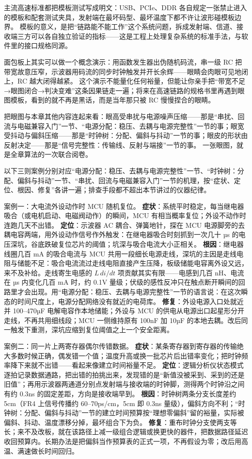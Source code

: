 主流高速标准都把模板测试写成明文：USB、PCIe、DDR 各自规定一张禁止进入的模板和配套测试夹具，发射端在最坏码型、最坏温度下都不许让波形碰模板边界。
模板的意义，是把“链路能不能工作”这个系统问题，拆成发射端、信道、接收端三方可以各自独立验证的指标——这是工程上处理复杂系统的标准手法，与软件里的接口规格同源。

面包板上其实可以做一个概念演示：用函数发生器出伪随机码流，串一级 RC 把带宽故意压窄，示波器用码流的同步时钟触发并开长余辉——眼睛会肉眼可见地闭上，RC 越大闭得越紧。
这个演示不能量化任何裕量，但能让你亲手把“带宽不足→眼图闭合→判决变难”这条因果链走一遍；将来在高速链路的规格书里再遇到眼图模板，看到的就不再是黑话，而是当年那只被 RC 慢慢捏合的眼睛。

把眼图与本章其他内容连起来看：眼高受串扰与电源噪声压缩——那是“串扰、回流与电磁兼容入门”一节、“电源分配：稳压、去耦与电源完整性”一节的事；眼宽受抖动与偏斜压缩——那是“时钟树：分配、偏斜与抖动”一节的事；眼皮的形状由反射决定——那是“信号完整性：传输线、反射与端接”一节的事。
一张眼图，就是全章算法的一次联合阅卷。

以下三则案例分别对应“电源分配：稳压、去耦与电源完整性”一节、“时钟树：分配、偏斜与抖动”一节、“串扰、回流与电磁兼容入门”一节的机理，按“症状、定位、根因、修复”各讲一遍；排查手段都不超出本节讲过的仪器纪律。

案例一：大电流外设动作时 MCU 随机复位。
\textbf{症状}：系统平时稳定，每当继电器吸合（或电机启动、电磁阀动作）的瞬间，MCU 有相当概率复位；外设不动作时连跑几天不出错。
\textbf{定位}：示波器 AC 耦合、弹簧地针，探在 MCU 电源脚旁的去耦电容两端，用外设动作信号作外触发：在继电器吸合时刻抓到一次几十 µs 的电压深坑，谷底跌破复位芯片的阈值；坑深与吸合电流大小正相关。
\textbf{根因}：继电器线圈几百 mA 的吸合电流与 MCU 共用一段细长电源走线，深坑的主因是走线电阻与储能不足：吸合电流流过走线电阻直接产生压降，板级储能电容离外设又远，来不及补给。走线寄生电感的 $L\,di/dt$ 项贡献其实有限——电感到几百 nH、电流在 µs 内变化几百 mA 时，约 0.1V 量级；伏级的感性反冲只在触点断开瞬间的回路里才会出现。用“电源分配：稳压、去耦与电源完整性”一节的语言说：在这次瞬态的时间尺度上，电源分配网络没有就近的电荷库。
\textbf{修复}：外设电源入口处就近并 100--470µF 电解电容作本地储能；外设与 MCU 的供电从电源出口起星形分开走线，不再共用细线段；MCU 一侧维持原有 100nF 加 10µF 的本地去耦。改后同一触发下重测，深坑应缩到复位阈值之上一个安全距离。

案例二：同一片上两寄存器偶尔传错数据。
\textbf{症状}：某条寄存器到寄存器的传输绝大多数时候正确，偶发错一个值；温度升高或换一批芯片后出错率变化；把时钟频率降下来就不出错——看起来像建立时间裕量不足。
\textbf{定位}：逻辑分析仪状态模式逐拍记录数据通路，把出错的拍挑出来，发现错的是“新值没被采到、采到的还是旧值”；再用示波器两通道分别点发射端与接收端的时钟脚，测得两个时钟沿之间有约 0.3ns 的固定差距，方向是接收端早到。
\textbf{根因}：时钟树两条分支长度差约 5cm（FR4 上信号传播约 60--70ps/cm，5cm 即 0.3ns 量级），偏斜方向不利；“时钟树：分配、偏斜与抖动”一节的建立时间预算按“理想零偏斜”留的裕量，实际被偏斜、抖动、温度漂移分掉，最坏组合下为负。
\textbf{修复}：重布时钟分支使两支等长；来不及改板，就在该路径上减一级组合逻辑或换更快的器件，把数据路径延迟收回预算内。长期办法是把偏斜当作预算表的正式一项，不再假设为零；改后用高温、满速做长时间回归。

